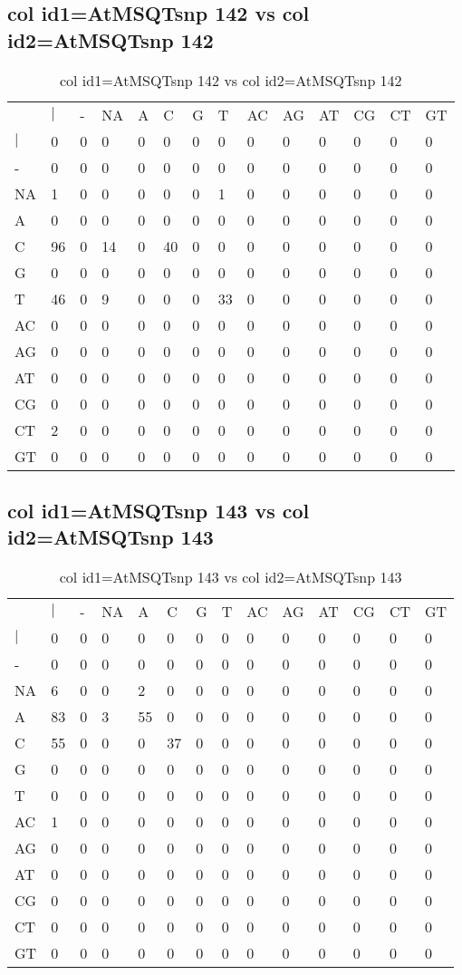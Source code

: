 \subsection{col id1=AtMSQTsnp 142 vs col id2=AtMSQTsnp 142}
\begin{center}
\begin{longtable}{|l|l|l|l|l|l|l|l|l|l|l|l|l|l|}
\caption{col id1=AtMSQTsnp 142 vs col id2=AtMSQTsnp 142} \label{table_dm522}\\
\hline
\\
\hline
&$|$&-&NA&A&C&G&T&AC&AG&AT&CG&CT&GT\\
$|$&0&0&0&0&0&0&0&0&0&0&0&0&0\\
-&0&0&0&0&0&0&0&0&0&0&0&0&0\\
NA&1&0&0&0&0&0&1&0&0&0&0&0&0\\
A&0&0&0&0&0&0&0&0&0&0&0&0&0\\
C&96&0&14&0&40&0&0&0&0&0&0&0&0\\
G&0&0&0&0&0&0&0&0&0&0&0&0&0\\
T&46&0&9&0&0&0&33&0&0&0&0&0&0\\
AC&0&0&0&0&0&0&0&0&0&0&0&0&0\\
AG&0&0&0&0&0&0&0&0&0&0&0&0&0\\
AT&0&0&0&0&0&0&0&0&0&0&0&0&0\\
CG&0&0&0&0&0&0&0&0&0&0&0&0&0\\
CT&2&0&0&0&0&0&0&0&0&0&0&0&0\\
GT&0&0&0&0&0&0&0&0&0&0&0&0&0\\
\hline
\end{longtable}
\end{center}

\subsection{col id1=AtMSQTsnp 143 vs col id2=AtMSQTsnp 143}
\begin{center}
\begin{longtable}{|l|l|l|l|l|l|l|l|l|l|l|l|l|l|}
\caption{col id1=AtMSQTsnp 143 vs col id2=AtMSQTsnp 143} \label{table_dm524}\\
\hline
\\
\hline
&$|$&-&NA&A&C&G&T&AC&AG&AT&CG&CT&GT\\
$|$&0&0&0&0&0&0&0&0&0&0&0&0&0\\
-&0&0&0&0&0&0&0&0&0&0&0&0&0\\
NA&6&0&0&2&0&0&0&0&0&0&0&0&0\\
A&83&0&3&55&0&0&0&0&0&0&0&0&0\\
C&55&0&0&0&37&0&0&0&0&0&0&0&0\\
G&0&0&0&0&0&0&0&0&0&0&0&0&0\\
T&0&0&0&0&0&0&0&0&0&0&0&0&0\\
AC&1&0&0&0&0&0&0&0&0&0&0&0&0\\
AG&0&0&0&0&0&0&0&0&0&0&0&0&0\\
AT&0&0&0&0&0&0&0&0&0&0&0&0&0\\
CG&0&0&0&0&0&0&0&0&0&0&0&0&0\\
CT&0&0&0&0&0&0&0&0&0&0&0&0&0\\
GT&0&0&0&0&0&0&0&0&0&0&0&0&0\\
\hline
\end{longtable}
\end{center}

